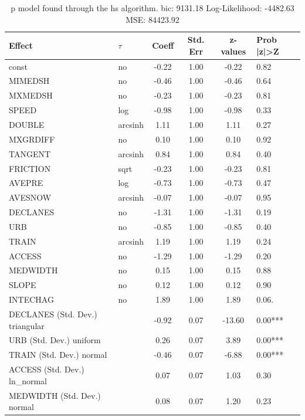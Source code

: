 \begin{table}
	\caption{p model found through the hs algorithm. bic: 9131.18 Log-Likelihood: -4482.63 MSE: 84423.92}
	\begin{center}
		\begin{tabular}{|l|l|c|c|c|l|}
			\hline
			Effect & $\tau$ & Coeff & Std. Err & z-values & Prob |z|>Z \\
			\hline
			const & no & -0.22 & 1.00 & -0.22 & 0.82 \\
			\hline
			MIMEDSH & no & -0.46 & 1.00 & -0.46 & 0.64 \\
			\hline
			MXMEDSH & no & -0.23 & 1.00 & -0.23 & 0.81 \\
			\hline
			SPEED & log & -0.98 & 1.00 & -0.98 & 0.33 \\
			\hline
			DOUBLE & arcsinh & 1.11 & 1.00 & 1.11 & 0.27 \\
			\hline
			MXGRDIFF & no & 0.10 & 1.00 & 0.10 & 0.92 \\
			\hline
			TANGENT & arcsinh & 0.84 & 1.00 & 0.84 & 0.40 \\
			\hline
			FRICTION & sqrt & -0.23 & 1.00 & -0.23 & 0.81 \\
			\hline
			AVEPRE & log & -0.73 & 1.00 & -0.73 & 0.47 \\
			\hline
			AVESNOW & arcsinh & -0.07 & 1.00 & -0.07 & 0.95 \\
			\hline
			DECLANES & no & -1.31 & 1.00 & -1.31 & 0.19 \\
			\hline
			URB & no & -0.85 & 1.00 & -0.85 & 0.40 \\
			\hline
			TRAIN & arcsinh & 1.19 & 1.00 & 1.19 & 0.24 \\
			\hline
			ACCESS & no & -1.29 & 1.00 & -1.29 & 0.20 \\
			\hline
			MEDWIDTH & no & 0.15 & 1.00 & 0.15 & 0.88 \\
			\hline
			SLOPE & no & 0.12 & 1.00 & 0.12 & 0.90 \\
			\hline
			INTECHAG & no & 1.89 & 1.00 & 1.89 & 0.06. \\
			\hline
			DECLANES (Std. Dev.) triangular &  & -0.92 & 0.07 & -13.60 & 0.00*** \\
			\hline
			URB (Std. Dev.) uniform &  & 0.26 & 0.07 & 3.89 & 0.00*** \\
			\hline
			TRAIN (Std. Dev.) normal &  & -0.46 & 0.07 & -6.88 & 0.00*** \\
			\hline
			ACCESS (Std. Dev.) ln_normal &  & 0.07 & 0.07 & 1.03 & 0.30 \\
			\hline
			MEDWIDTH (Std. Dev.) normal &  & 0.08 & 0.07 & 1.20 & 0.23 \\

\end{tabular}
\end{center}
\end{table}
